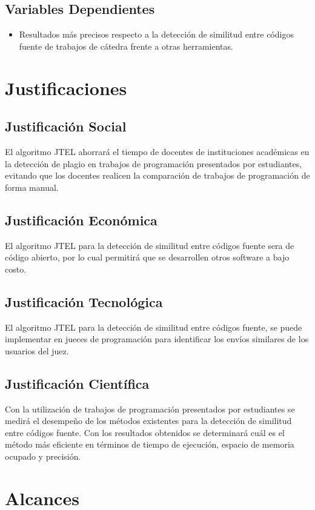 \subsection{Variables Dependientes}
\begin{itemize}
    \item Resultados más precisos respecto a la detección de similitud entre códigos fuente de trabajos de cátedra frente a otras herramientas.
\end{itemize}
\section{Justificaciones}
\subsection{Justificación Social}
El algoritmo JTEL ahorrará el tiempo de docentes de instituciones académicas en la detección de plagio en trabajos de programación presentados por estudiantes, evitando que los docentes realicen la comparación de trabajos de programación de forma manual.
\subsection{Justificación Económica}
El algoritmo JTEL para la detección de similitud entre códigos fuente sera de código abierto, por lo cual permitirá que se desarrollen otros software a bajo costo.
\subsection{Justificación Tecnológica}
El algoritmo JTEL para la detección de similitud entre códigos fuente, se puede implementar en jueces de programación para identificar los envíos similares de los usuarios del juez.
\subsection{Justificación Científica}
Con la utilización de trabajos de programación presentados por estudiantes se medirá el desempeño de los métodos existentes para la detección de similitud entre códigos fuente. Con los resultados obtenidos se determinará cuál es el método más eficiente en términos de tiempo de ejecución, espacio de memoria ocupado y precisión.
\section{Alcances}
